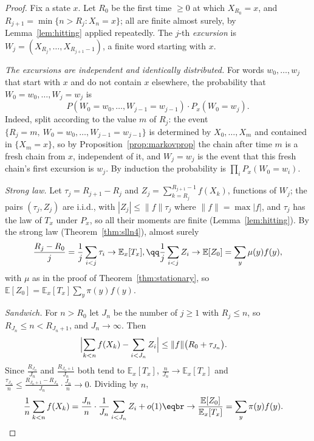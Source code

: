 \begin{proof}
Fix a state $x$. Let $R_0$ be the first time $\ge0$ at which $X_{R_0}=x$, and $R_{j+1}=\min\{n>R_j:X_n=x\}$; all are finite almost surely, by
Lemma~\ref{lem:hitting} applied repeatedly. The $j$-th \emph{excursion} is $W_j=(X_{R_j},\dots,X_{R_{j+1}-1})$, a finite word starting with $x$.

\emph{The excursions are independent and identically distributed.} For words $w_0,\dots,w_j$ that start with $x$ and do not
contain $x$ elsewhere,
the probability that $W_0=w_0,\dots,W_j=w_j$ is
\[
P(W_0=w_0,\dots,W_{j-1}=w_{j-1})\cdot P_x(W_0=w_j).
\]
Indeed, split according to the value $m$ of $R_j$: the event $\{R_j=m,\ W_0=w_0,\dots,W_{j-1}=w_{j-1}\}$ is determined by $X_0,\dots,X_m$ and
contained in $\{X_m=x\}$, so by Proposition~\ref{prop:markovprop} the chain after time $m$ is a fresh chain from $x$, independent of it, and $W_j=w_j$
is the event that this fresh chain's first excursion is $w_j$. By induction the probability is $\prod_iP_x(W_0=w_i)$.

\emph{Strong law.} Let $\tau_j=R_{j+1}-R_j$ and $Z_j=\sum_{k=R_j}^{R_{j+1}-1}f(X_k)$, functions of $W_j$; the pairs $(\tau_j,Z_j)$ are i.i.d., with $|Z_j|\le\|f\|\tau_j$ where
$\|f\|=\max|f|$, and $\tau_j$ has the law of $T_x$ under $P_x$, so all their moments are finite (Lemma~\ref{lem:hitting}). By the strong law
(Theorem~\ref{thm:slln4}), almost surely
\[
\begin{gathered}\frac{R_j-R_0}j=\frac1j\sum_{i<j}\tau_i\to\mathbb E_x[T_x],\qq\frac1j\sum_{i<j}Z_i\to\mathbb E[Z_0]=\sum_y\mu(y)f(y),\end{gathered}
\]
with $\mu$ as in the proof of Theorem~\ref{thm:stationary}, so $\mathbb E[Z_0]=\mathbb E_x[T_x]\sum_y\pi(y)f(y)$.

\emph{Sandwich.} For $n>R_0$ let $J_n$ be the number of $j\ge1$ with $R_j\le n$, so $R_{J_n}\le n<R_{J_n+1}$, and $J_n\to\infty$. Then
\[
\begin{aligned}\Bigl|\sum_{k<n}f(X_k)-\sum_{i<J_n}Z_i\Bigr|&\le\|f\|\bigl(R_0+\tau_{J_n}\bigr).\end{aligned}
\]
Since $\frac{R_{J_n}}{J_n}$ and $\frac{R_{J_n+1}}{J_n}$ both tend to $\mathbb E_x[T_x]$, $\frac n{J_n}\to\mathbb E_x[T_x]$ and $\frac{\tau_{J_n}}n\le\frac{R_{J_n+1}-R_{J_n}}{J_n}\cdot\frac{J_n}n\to0$. Dividing by $n$,
\[
\begin{aligned}\frac1n\sum_{k<n}f(X_k)&=\frac{J_n}n\cdot\frac1{J_n}\sum_{i<J_n}Z_i+o(1)\eqbr\to\frac{\mathbb E[Z_0]}{\mathbb E_x[T_x]}=\sum_y\pi(y)f(y).\end{aligned}
\]
\end{proof}

